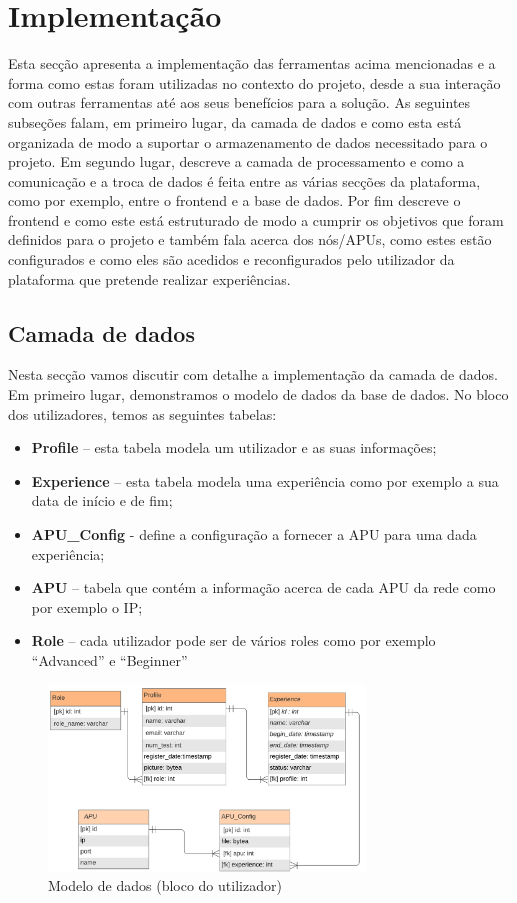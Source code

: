 \chapter{Implementação}
\label{chp:implement}
Esta secção apresenta a implementação das ferramentas acima mencionadas e a forma como estas foram utilizadas no contexto do projeto, desde a sua interação com outras ferramentas até aos seus benefícios para a solução. As seguintes subseções falam, em primeiro lugar, da camada de dados e como esta está organizada de modo a suportar o armazenamento de dados necessitado para o projeto.\newline
Em segundo lugar, descreve a camada de processamento e como a comunicação e a troca de dados é feita entre as várias secções da plataforma, como por exemplo, entre o frontend e a base de dados.\newline
Por fim descreve o frontend e como este está estruturado de modo a cumprir os objetivos que foram definidos para o projeto e também fala acerca dos nós/APUs, como estes estão configurados e como eles são acedidos e reconfigurados pelo utilizador da plataforma que pretende realizar experiências.

\section{Camada de dados}
Nesta secção vamos discutir com detalhe a implementação da camada de dados. Em primeiro lugar, demonstramos o modelo de dados da base de dados.\newline
No bloco dos utilizadores, temos as seguintes tabelas:
\begin{itemize}
    \item \textbf{Profile} – esta tabela modela um utilizador e as suas informações;
    \item \textbf{Experience} – esta tabela modela uma experiência como por exemplo a sua data de início e de fim;
    \item \textbf{APU\_Config} - define a configuração a fornecer a APU para uma dada experiência;
    \item \textbf{APU} – tabela que contém a informação acerca de cada APU da rede como por exemplo o IP;
    \item \textbf{Role} – cada utilizador pode ser de vários roles como por exemplo “Advanced” e “Beginner”
\end{itemize}
\begin{figure}[!ht]
    \centering
    \includegraphics[width=0.75\textwidth, height=0.347\textheight]{images/data_model.png}
    \caption{Modelo de dados (bloco do utilizador)}
    \label{fig:dataModel}
\end{figure}
